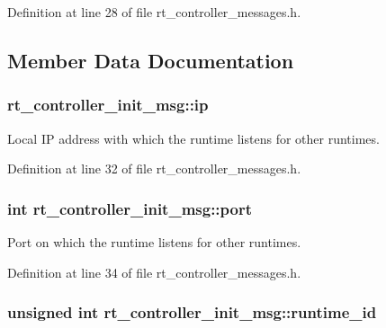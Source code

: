Definition at line 28 of file rt\-\_\-controller\-\_\-messages.\-h.



\subsection{Member Data Documentation}
\hypertarget{structrt__controller__init__msg_a9cf153e2f8ab32bc6458db829d6583ce}{
\subsubsection[{ip}]{ rt\-\_\-controller\-\_\-init\-\_\-msg\-::ip}}\label{structrt__controller__init__msg_a9cf153e2f8ab32bc6458db829d6583ce}


Local I\-P address with which the runtime listens for other runtimes. 



Definition at line 32 of file rt\-\_\-controller\-\_\-messages.\-h.

\hypertarget{structrt__controller__init__msg_ab269a1da6a3fc076d8183244b7efbb24}{
\subsubsection[{port}]{\setlength{\rightskip}{0pt plus 5cm}int rt\-\_\-controller\-\_\-init\-\_\-msg\-::port}}\label{structrt__controller__init__msg_ab269a1da6a3fc076d8183244b7efbb24}


Port on which the runtime listens for other runtimes. 



Definition at line 34 of file rt\-\_\-controller\-\_\-messages.\-h.

\hypertarget{structrt__controller__init__msg_a97110c58e5b06491f20f50ae3712fd75}{
\subsubsection[{runtime\-\_\-id}]{\setlength{\rightskip}{0pt plus 5cm}unsigned int rt\-\_\-controller\-\_\-init\-\_\-msg\-::runtime\-\_\-id}}\label{structrt__controller__init__msg_a97110c58e5b06491f20f50ae3712fd75}


